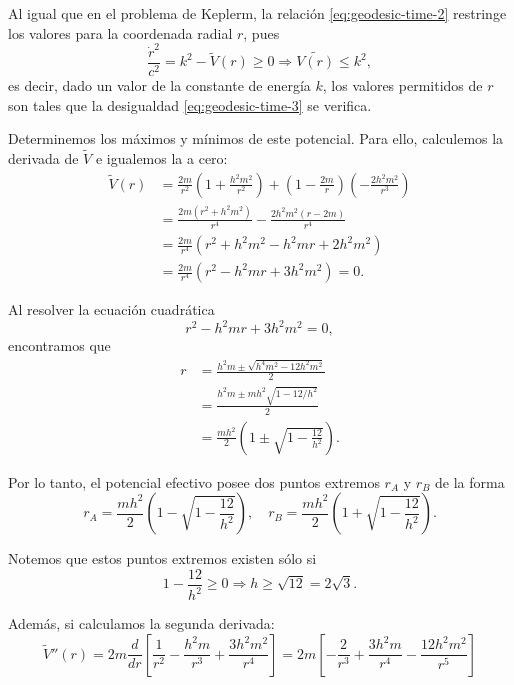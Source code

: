 \documentclass[letterpaper,11pt]{article}
\begin{document}
 Al igual que en el problema de Keplerm, la relación \eqref{eq:geodesic-time-2} restringe los valores para la coordenada radial $r$, pues 
\begin{equation} \label{eq:geodesic-time-3}
\frac{\dot{r}^2}{c^2} = k^2 - \tilde{V}(r) \geq 0 \Rightarrow \tilde{V(r)} \leq k^2,
\end{equation}
es decir, dado un valor de la constante de energía $k$, los valores permitidos de $r$ son tales que la desigualdad \eqref{eq:geodesic-time-3} se verifica.

Determinemos los máximos y mínimos de este potencial. Para ello, calculemos la derivada de $\tilde{V}$ e igualemos la a cero:
\begin{align}
\tilde{V}(r) &= \frac{2m}{r^2} \left(1 + \frac{h^2m^2}{r^2} \right) + \left( 1 - \frac{2m}{r}\right) \left(-\frac{2h^2m^2}{r^3} \right) \\
&= \frac{2m(r^2 + h^2m^2)}{r^4}- \frac{2h^2m^2(r-2m)}{r^4} \\
&= \frac{2m}{r^4} \left( r^2 + h^2m^2 - h^2mr + 2h^2m^2 \right) \\
&= \frac{2m}{r^4} \left( r^2 -  h^2m r + 3h^2m^2 \right) = 0.
\end{align}

Al resolver la ecuación cuadrática
\begin{equation}
 r^2 -  h^2m r + 3h^2m^2  = 0,
\end{equation}
encontramos que
\begin{align}
r &= \frac{h^2m \pm \sqrt{h^4m^2 - 12 h^2m^2}}{2} \\
&= \frac{h^2m \pm mh^2 \sqrt{1 - 12/h^2}}{2} \\
&= \frac{mh^2}{2} \left(1 \pm \sqrt{1 - \frac{12}{h^2}} \right).
\end{align}

Por lo tanto, el potencial efectivo posee dos puntos extremos $r_A$ y $r_B$ de la forma
\begin{equation} \label{eq:extremos-locales}
r_A = \frac{mh^2}{2} \left(1 - \sqrt{1 - \frac{12}{h^2}} \right), \quad r_B =\frac{mh^2}{2} \left(1 + \sqrt{1 - \frac{12}{h^2}} \right).
\end{equation}

Notemos que estos puntos extremos existen sólo si
\begin{equation}
1 - \frac{12}{h^2} \geq 0 \Rightarrow h \geq \sqrt{12} = 2\sqrt{3}.
\end{equation}

Además, si calculamos la segunda derivada:
\begin{equation}
\tilde{V}''(r) = 2m \frac{d}{dr} \left[\frac{1}{r^2} - \frac{h^2m}{r^3} + \frac{3h^2m^2}{r^4} \right] = 2m \left[ - \frac{2}{r^3} + \frac{3h^2m}{r^4} - \frac{12h^2m^2}{r^5} \right] 
\end{equation}
\end{document}
